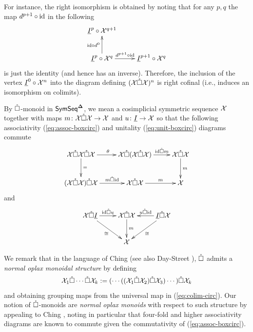 For instance, the right isomorphism is obtained by noting that for any $p,q$ the map $d^{p+1}\circ\mathrm{id}$ in the following \[ \xymatrix{
        \underline{I}^p \circ \Cal{X}^{q+1} 
        & \\
        \underline{I}^p \circ \Cal{X}^q \ar[u]^-{\id\circ d^0} \ar[r]^-{d^{p+1}\circ \id}
        &
        \underline{I}^{p+1} \circ \Cal{X}^{q} 
        } \]
    is just the identity (and hence has an inverse). Therefore, the inclusion of the vertex $\underline{I}^0\circ \mathcal{X}^n$ into the diagram defining $(\mathcal{X}\mathring{\square} \mathcal{X})^n$ is right cofinal (i.e., induces an isomorphism on colimits). 
    

\begin{definition} \label{boxcirc-monoid} By $\mathring{\square}$-monoid in $\mathsf{SymSeq}^{\mathbf{\Delta}}$, we mean a cosimplicial symmetric sequence $\mathcal{X}$ together with maps $m\colon \mathcal{X} \mathring{\square} \mathcal{X} \to \mathcal{X}$ and $u\colon \underline{I} \to \mathcal{X}$ so that the following associativity (\ref{eq:assoc-boxcirc}) and unitality (\ref{eq:unit-boxcirc}) diagrams commute
    \begin{equation} \label{eq:assoc-boxcirc} \xymatrix{  
        \Cal{X} \boxcirc \Cal{X} \boxcirc \Cal{X} \ar[r]^{\theta} \ar[d]^-{=}&
        \Cal{X} \boxcirc (\Cal{X} \boxcirc \Cal{X}) \ar[r]^-{\id \boxcirc m} &
        \Cal{X} \boxcirc \Cal{X} \ar[d]^-{m} \\
        (\Cal{X} \boxcirc \Cal{X}) \boxcirc \Cal{X} \ar[r]^-{m \boxcirc \id} &
        \Cal{X} \boxcirc \Cal{X} \ar[r]^-{m} &
        \Cal{X}
        }\end{equation}
    and
   \begin{equation} \label{eq:unit-boxcirc} \xymatrix{ 
        \Cal{X} \boxcirc \underline{I} \ar[r]^-{\id\boxcirc u} \ar[dr]_-{\cong}
        &
        \Cal{X} \boxcirc \Cal{X} \ar[d]^-{m}
        & 
        \underline{I}\boxcirc \Cal{X} \ar[l]_-{u\boxcirc \id} \ar[dl]^-{\cong}\\
        & \Cal{X}  &
        } 
    \end{equation}
\end{definition} 

\begin{remark}
We remark that in the language of Ching \cite{Ching-oplax} (see also Day-Street \cite{Day-St}), $\mathring{\square}$ admits a \textit{normal oplax monoidal structure} by defining \[ \mathcal{X}_1\mathring{\square} \cdots \mathring{\square} \mathcal{X}_k:= (\cdots (( \mathcal{X}_1 \mathring{\square} \mathcal{X}_2) \mathring{\square} \mathcal{X}_3) \cdots)  \mathring{\square} \mathcal{X}_k \] and obtaining grouping maps from the universal map in (\ref{eq:colim-circ}). Our notion of $\mathring{\square}$-monoids are \textit{normal oplax monoids} with respect to such structure by appealing to Ching \cite[3.4]{Ching-oplax}, noting in particular that four-fold and higher associativity diagrams are known to commute given the commutativity of (\ref{eq:assoc-boxcirc}).
\end{remark}

